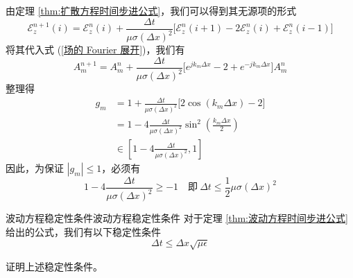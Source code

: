 \begin{solution}
    由定理 \ref{thm:扩散方程时间步进公式}，我们可以得到其无源项的形式
    \begin{equation*}
        \mathscr{E}_z^{n+1}(i)=\mathscr{E}_z^n(i)
        +\frac{\Delta t}{\mu \sigma (\Delta x)^2}
        \Big[\mathscr{E}_z^n(i+1)-2\mathscr{E}_z^n(i)+\mathscr{E}_z^n(i-1)\Big]
    \end{equation*}
    将其代入式 (\ref{场的 Fourier 展开})，我们有
    \begin{equation*}
        A_m^{n+1}=A_m^n
        +\frac{\Delta t}{\mu \sigma (\Delta x)^2}
        \Big[e^{jk_m \Delta x}-2+e^{-jk_m \Delta x}\Big]A_m^n
    \end{equation*}
    整理得
    \begin{align*}
        g_m&=1
        +\frac{\Delta t}{\mu \sigma (\Delta x)^2}
        \Big[2\cos (k_m \Delta x)-2\Big]\\
        &=1-4\frac{\Delta t}{\mu \sigma (\Delta x)^2}
        \sin^2\left(\frac{k_m \Delta x}{2}\right)\\
        &\in \left[1 - 4\frac{\Delta t}{\mu \sigma (\Delta x)^2}, 1\right]
    \end{align*}
    因此，为保证 $|g_m|\leq 1$，必须有
    \begin{equation*}
        1 - 4\frac{\Delta t}{\mu \sigma (\Delta x)^2} \geq -1
        \quad \text{即} \ 
        \Delta t \leq \frac{1}{2} \mu \sigma (\Delta x)^2
    \end{equation*}
\end{solution}

\begin{theorem}{波动方程稳定性条件}{波动方程稳定性条件}
    对于定理 \ref{thm:波动方程时间步进公式} 给出的公式，我们有以下稳定性条件
    \begin{equation}
        \Delta t \leq \Delta x \sqrt{\mu \epsilon}
    \end{equation}
\end{theorem}

\begin{exercise}
    证明上述稳定性条件。
\end{exercise}

